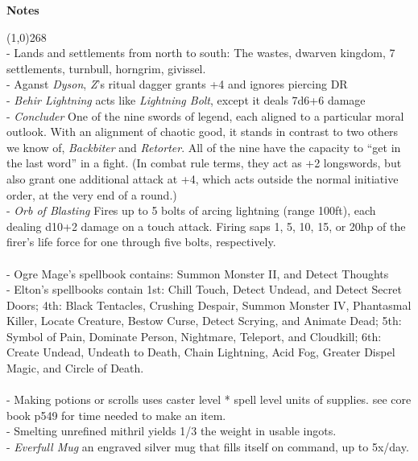 \documentclass[letterpaper]{article}
\newcommand{\colline}{\line(1,0){268} \\}
\newcommand{\e}[1]{\emph{#1}}
\newcommand{\B}[1]{\textbf{#1}}
\newenvironment{notesection}[1]
{ {\huge \B{#1}} \par
\vspace{-0.75em}
\colline
\begingroup\fontsize{9pt}{12pt}\selectfont}
{\endgroup}
\begin{document}
\begin{notesection}{Notes}
- Lands and settlements from north to south: The wastes, dwarven kingdom, 7 settlements, turnbull, horngrim, givissel.\\
- Aganst \e{Dyson}, \e{Z}'s ritual dagger grants +4 and ignores piercing DR\\
- \e{Behir Lightning} acts like \e{Lightning Bolt}, except it deals 7d6+6 damage\\
- \e{Concluder} One of the nine swords of legend, each aligned to a particular moral outlook. With an alignment of chaotic good, it stands in contrast to two others we know of, \e{Backbiter} and \e{Retorter}. All of the nine have the capacity to ``get in the last word'' in a fight. (In combat rule terms, they act as +2 longswords, but also grant one additional attack at +4, which acts outside the normal initiative order, at the very end of a round.)\\
- \e{Orb of Blasting} Fires up to 5 bolts of arcing lightning (range 100ft), each dealing d10+2 damage on a touch attack. Firing saps 1, 5, 10, 15, or 20hp of the firer's life force for one through five bolts, respectively.\\\\
- Ogre Mage's spellbook contains: Summon Monster II, and Detect Thoughts\\
- Elton's spellbooks contain 1st: Chill Touch, Detect Undead, and Detect Secret Doors; 4th: Black Tentacles, Crushing Despair, Summon Monster IV, Phantasmal Killer, Locate Creature, Bestow Curse, Detect Scrying, and Animate Dead; 5th: Symbol of Pain, Dominate Person, Nightmare, Teleport, and Cloudkill; 6th: Create Undead, Undeath to Death, Chain Lightning, Acid Fog, Greater Dispel Magic, and Circle of Death.\\\\
- Making potions or scrolls uses caster level * spell level units of supplies. see core book p549 for time needed to make an item.\\
- Smelting unrefined mithril yields 1/3 the weight in usable ingots.\\
- \e{Everfull Mug} an engraved silver mug that fills itself on command, up to 5x/day.\\


\end{notesection}
\end{document}
